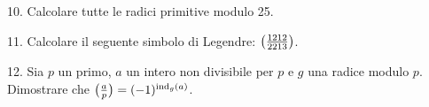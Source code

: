 \item{10.} Calcolare tutte le radici primitive modulo 25.\ve\ \vs

\item{11.} Calcolare il seguente simbolo di Legendre: $\big({1212\over2213}\big)$.\vss %

\item{12.} Sia $p$ un primo, $a$ un intero non divisibile per $p$ e $g$ una radice modulo $p$. Dimostrare che $\big({a\over p}\big)=(-1)^{{\rm ind}_g(a)}$.\vv\ \vst\vskip-8mm

 \bye
